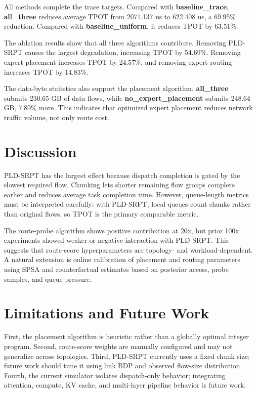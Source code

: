 \documentclass[10pt,conference]{IEEEtran}
\begin{document}
All methods complete the trace targets. Compared with \textbf{baseline\_trace}, \textbf{all\_three} reduces average TPOT from 2071.137 us to 622.408 us, a 69.95\% reduction. Compared with \textbf{baseline\_uniform}, it reduces TPOT by 63.51\%.

The ablation results show that all three algorithms contribute. Removing PLD-SRPT causes the largest degradation, increasing TPOT by 54.69\%. Removing expert placement increases TPOT by 24.57\%, and removing expert routing increases TPOT by 14.83\%.

The data-byte statistics also support the placement algorithm. \textbf{all\_three} submits 230.65 GB of data flows, while \textbf{no\_expert\_placement} submits 248.64 GB, 7.80\% more. This indicates that optimized expert placement reduces network traffic volume, not only route cost.

\section{Discussion}

PLD-SRPT has the largest effect because dispatch completion is gated by the slowest required flow. Chunking lets shorter remaining flow groups complete earlier and reduces average task completion time. However, queue-length metrics must be interpreted carefully: with PLD-SRPT, local queues count chunks rather than original flows, so TPOT is the primary comparable metric.

The route-probe algorithm shows positive contribution at 20x, but prior 100x experiments showed weaker or negative interaction with PLD-SRPT. This suggests that route-score hyperparameters are topology- and workload-dependent. A natural extension is online calibration of placement and routing parameters using SPSA and counterfactual estimates based on posterior access, probe samples, and queue pressure.

\section{Limitations and Future Work}

First, the placement algorithm is heuristic rather than a globally optimal integer program. Second, route-score weights are manually configured and may not generalize across topologies. Third, PLD-SRPT currently uses a fixed chunk size; future work should tune it using link BDP and observed flow-size distribution. Fourth, the current simulator isolates dispatch-only behavior; integrating attention, compute, KV cache, and multi-layer pipeline behavior is future work.
\end{document}
